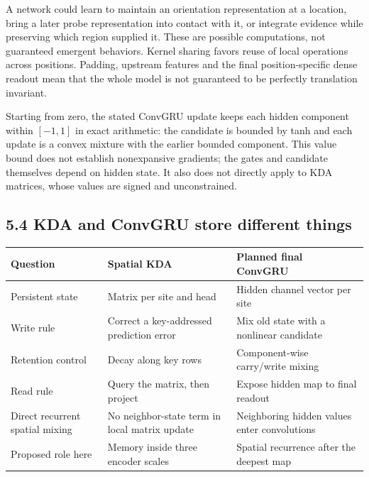 \documentclass[
  11pt,
]{article}
\newcounter{none} %
\let\oldsubsection\subsection
\renewcommand{\subsection}{\Needspace{6\baselineskip}\oldsubsection}
\begin{document}
A network could learn to maintain an orientation representation at a
location, bring a later probe representation into contact with it, or
integrate evidence while preserving which region supplied it. These are
possible computations, not guaranteed emergent behaviors. Kernel sharing
favors reuse of local operations across positions. Padding, upstream
features and the final position-specific dense readout mean that the
whole model is not guaranteed to be perfectly translation invariant.

Starting from zero, the stated ConvGRU update keeps each hidden
component within \([-1,1]\) in exact arithmetic: the candidate is
bounded by tanh and each update is a convex mixture with the earlier
bounded component. This value bound does not establish nonexpansive
gradients; the gates and candidate themselves depend on hidden state. It
also does not directly apply to KDA matrices, whose values are signed
and unconstrained.

\subsection{5.4 KDA and ConvGRU store different
things}\label{kda-and-convgru-store-different-things}

{\def\LTcaptype{none} %
\begin{longtable}[]{@{}
  >{\raggedright\arraybackslash}p{}
  >{\raggedright\arraybackslash}p{}
  >{\raggedright\arraybackslash}p{}@{}}
\toprule\noalign{}
\begin{minipage}[b]{\linewidth}\raggedright
Question
\end{minipage} & \begin{minipage}[b]{\linewidth}\raggedright
Spatial KDA
\end{minipage} & \begin{minipage}[b]{\linewidth}\raggedright
Planned final ConvGRU
\end{minipage} \\
\midrule\noalign{}
\endhead
\bottomrule\noalign{}
\endlastfoot
Persistent state & Matrix per site and head & Hidden channel vector per
site \\
Write rule & Correct a key-addressed prediction error & Mix old state
with a nonlinear candidate \\
Retention control & Decay along key rows & Component-wise carry/write
mixing \\
Read rule & Query the matrix, then project & Expose hidden map to final
readout \\
Direct recurrent spatial mixing & No neighbor-state term in local matrix
update & Neighboring hidden values enter convolutions \\
Proposed role here & Memory inside three encoder scales & Spatial
recurrence after the deepest map \\
\end{longtable}
}
\end{document}
